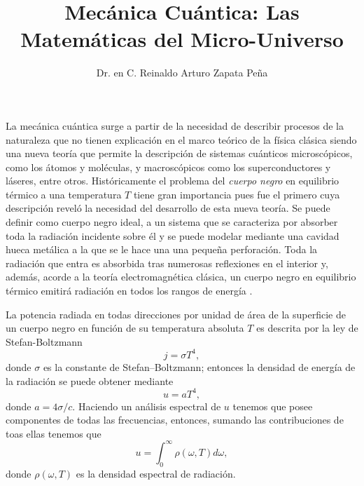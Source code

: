 \documentclass{article}
\title{Mecánica Cuántica: Las Matemáticas del Micro-Universo}
\author{Dr. en C. Reinaldo Arturo Zapata Peña}
\date{}
\begin{document}
\maketitle

La mecánica cuántica surge a partir de la necesidad de describir procesos de la
naturaleza que no tienen explicación en el marco teórico de la física clásica
siendo una nueva teoría que permite la descripción de sistemas cuánticos
microscópicos, como los átomos y moléculas, y macroscópicos como los
superconductores y láseres, entre otros.
% 
Históricamente el problema del \emph{cuerpo negro} en equilibrio térmico a una
temperatura $T$ tiene gran importancia pues fue el primero cuya descripción
reveló la necesidad del desarrollo de esta nueva teoría.
% 
Se puede definir como cuerpo negro ideal, a un sistema que se caracteriza por
absorber toda la radiación incidente sobre él y se puede modelar mediante una
cavidad hueca metálica a la que se le hace una una pequeña perforación. Toda la
radiación que entra es absorbida tras numerosas reflexiones en el interior y,
además, acorde a la teoría electromagnética clásica, un cuerpo negro en
equilibrio térmico emitirá radiación en todos los rangos de energía
\cite{planck2013theory}.

La potencia radiada en todas direcciones por unidad de área de la superficie de
un cuerpo negro en función de su temperatura absoluta $T$ es descrita por la
ley de Stefan-Boltzmann
% 
\begin{equation}\label{eq:ley-stefan-boltzmann}
j = \sigma T^{4},
\end{equation}
% 
donde $\sigma$ es la constante de Stefan–Boltzmann; entonces la densidad de
energía de la radiación se puede obtener mediante 
%
\begin{equation}
u= aT^{4},
\end{equation}
donde $a = 4\sigma/c$. Haciendo un análisis espectral de $u$ tenemos que posee
componentes de todas las frecuencias, entonces, sumando las contribuciones de
toas ellas tenemos que 
% 
\begin{equation}
u = \int_{0}^{\infty} \rho(\omega, T)d\omega,
\end{equation}
% 
donde $\rho(\omega, T)$ es la densidad espectral de radiación.







\end{document}
